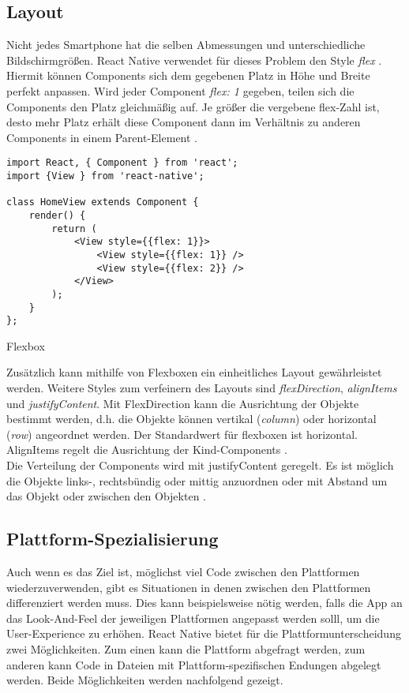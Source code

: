 \subsection{Layout}
Nicht jedes Smartphone hat die selben Abmessungen und unterschiedliche Bildschirmgrößen. React Native verwendet für dieses Problem den Style \textit{flex} \cite{facebook_inc._flex_2017}.  Hiermit können Components sich dem gegebenen Platz in Höhe und Breite perfekt anpassen. Wird jeder Component \textit{flex: 1} gegeben, teilen sich die Components den Platz gleichmäßig auf. Je größer die vergebene flex-Zahl ist, desto mehr Platz erhält diese Component dann im Verhältnis zu anderen Components in einem Parent-Element \cite{facebook_inc._flex_2017}. 

\begin{listing}[H]
    \begin{verbatim}
import React, { Component } from 'react';
import {View } from 'react-native';

class HomeView extends Component {
    render() {
        return (
            <View style={{flex: 1}}>
                <View style={{flex: 1}} />
                <View style={{flex: 2}} />
            </View>
        );
    }
};

    \end{verbatim}
    \caption{Flexbox}
    \label{lst:flex}
\end{listing}
Zusätzlich kann mithilfe von Flexboxen ein einheitliches Layout gewährleistet werden. Weitere Styles zum verfeinern des Layouts sind \textit{flexDirection}, \textit{alignItems} und \textit{justifyContent}. Mit FlexDirection kann die Ausrichtung der Objekte bestimmt werden, d.h. die Objekte können vertikal (\textit{column}) oder horizontal (\textit{row}) angeordnet werden. Der Standardwert für flexboxen ist horizontal. AlignItems regelt die Ausrichtung der Kind-Components \cite{facebook_inc._flex_2017}. \\

Die Verteilung der Components wird mit justifyContent geregelt. Es ist möglich die Objekte links-, rechtsbündig oder mittig anzuordnen oder mit Abstand um das Objekt oder zwischen den Objekten \cite{facebook_inc._flex_2017}.

\subsection{Plattform-Spezialisierung}
Auch wenn es das Ziel ist, möglichst viel Code zwischen den Plattformen wiederzuverwenden, gibt es Situationen in denen zwischen den Plattformen differenziert werden muss. Dies kann beispielsweise nötig werden, falls die App an das Look-And-Feel der jeweiligen Plattformen angepasst werden solll, um die User-Experience zu erhöhen.
React Native bietet für die Plattformunterscheidung zwei Möglichkeiten. Zum einen kann die Plattform abgefragt werden, zum anderen kann Code in Dateien mit Plattform-spezifischen Endungen abgelegt werden. Beide Möglichkeiten werden nachfolgend gezeigt.

